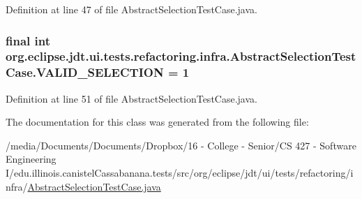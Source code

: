 Definition at line 47 of file AbstractSelectionTestCase.java.

\hypertarget{classorg_1_1eclipse_1_1jdt_1_1ui_1_1tests_1_1refactoring_1_1infra_1_1AbstractSelectionTestCase_ad3d8d4dd2004b2fdab94d0dbb003304d}{
\subsubsection[{VALID\_\-SELECTION}]{\setlength{\rightskip}{0pt plus 5cm}final int {\bf org.eclipse.jdt.ui.tests.refactoring.infra.AbstractSelectionTestCase.VALID\_\-SELECTION} = 1}}
\label{classorg_1_1eclipse_1_1jdt_1_1ui_1_1tests_1_1refactoring_1_1infra_1_1AbstractSelectionTestCase_ad3d8d4dd2004b2fdab94d0dbb003304d}


Definition at line 51 of file AbstractSelectionTestCase.java.



The documentation for this class was generated from the following file:\begin{DoxyCompactItemize}
\item 
/media/Documents/Documents/Dropbox/16 -\/ College -\/ Senior/CS 427 -\/ Software Engineering I/edu.illinois.canistelCassabanana.tests/src/org/eclipse/jdt/ui/tests/refactoring/infra/\hyperlink{AbstractSelectionTestCase_8java}{AbstractSelectionTestCase.java}\end{DoxyCompactItemize}
